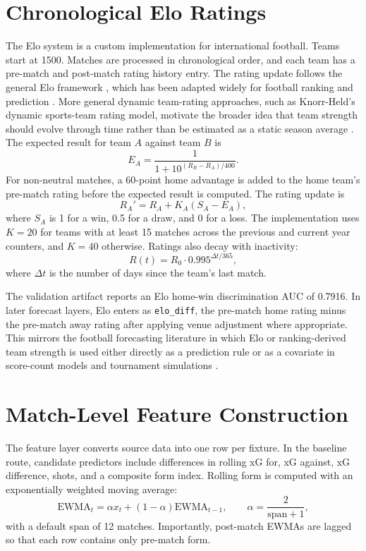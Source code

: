 \documentclass[11pt]{article}
\begin{document}
\section{Chronological Elo Ratings}

The Elo system is a custom implementation for international football. Teams
start at 1500. Matches are processed in chronological order, and each team has a
pre-match and post-match rating history entry. The rating update follows the
general Elo framework \cite{elo1978}, which has been adapted widely for
football ranking and prediction \cite{lasek2013,gilchmuller2018}. More general
dynamic team-rating approaches, such as Knorr-Held's dynamic sports-team rating
model, motivate the broader idea that team strength should evolve through time
rather than be estimated as a static season average \cite{knorrheld2000}. The
expected result for team $A$ against team $B$ is
\[
E_A = \frac{1}{1 + 10^{(R_B - R_A)/400}}.
\]
For non-neutral matches, a 60-point home advantage is added to the home team's
pre-match rating before the expected result is computed. The rating update is
\[
R_A' = R_A + K_A(S_A - E_A),
\]
where $S_A$ is 1 for a win, 0.5 for a draw, and 0 for a loss. The implementation
uses $K=20$ for teams with at least 15 matches across the previous and current
year counters, and $K=40$ otherwise. Ratings also decay with inactivity:
\[
R(t) = R_0 \cdot 0.995^{\Delta t / 365},
\]
where $\Delta t$ is the number of days since the team's last match.

The validation artifact reports an Elo home-win discrimination AUC of 0.7916.
In later forecast layers, Elo enters as \texttt{elo\_diff}, the pre-match home
rating minus the pre-match away rating after applying venue adjustment where
appropriate. This mirrors the football forecasting literature in which Elo or
ranking-derived team strength is used either directly as a prediction rule or
as a covariate in score-count models and tournament simulations
\cite{lasek2013,gilchmuller2018,groll2018rf}.

\section{Match-Level Feature Construction}

The feature layer converts source data into one row per fixture. In the baseline
route, candidate predictors include differences in rolling xG for, xG against,
xG difference, shots, and a composite form index. Rolling form is computed with
an exponentially weighted moving average:
\[
\mathrm{EWMA}_t = \alpha x_t + (1-\alpha)\mathrm{EWMA}_{t-1},
\qquad
\alpha = \frac{2}{\mathrm{span}+1},
\]
with a default span of 12 matches. Importantly, post-match EWMAs are lagged so
that each row contains only pre-match form.
\end{document}
